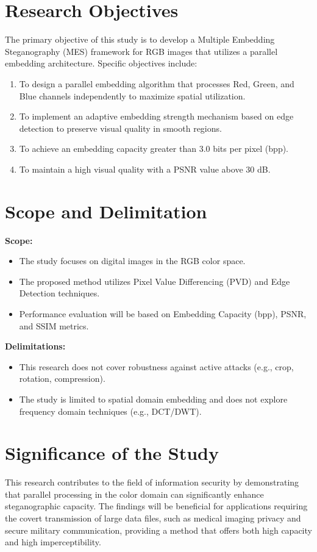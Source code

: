 \section{Research Objectives}
The primary objective of this study is to develop a Multiple Embedding Steganography (MES) framework for RGB images that utilizes a parallel embedding architecture.
Specific objectives include:
\begin{enumerate}
    \item To design a parallel embedding algorithm that processes Red, Green, and Blue channels independently to maximize spatial utilization.
    \item To implement an adaptive embedding strength mechanism based on edge detection to preserve visual quality in smooth regions.
    \item To achieve an embedding capacity greater than 3.0 bits per pixel (bpp).
    \item To maintain a high visual quality with a PSNR value above 30 dB.
\end{enumerate}

\section{Scope and Delimitation}
\textbf{Scope:}
\begin{itemize}
    \item The study focuses on digital images in the RGB color space.
    \item The proposed method utilizes Pixel Value Differencing (PVD) and Edge Detection techniques.
    \item Performance evaluation will be based on Embedding Capacity (bpp), PSNR, and SSIM metrics.
\end{itemize}

\textbf{Delimitations:}
\begin{itemize}
    \item This research does not cover robustness against active attacks (e.g., crop, rotation, compression).
    \item The study is limited to spatial domain embedding and does not explore frequency domain techniques (e.g., DCT/DWT).
\end{itemize}

\section{Significance of the Study}
This research contributes to the field of information security by demonstrating that parallel processing in the color domain can significantly enhance steganographic capacity. The findings will be beneficial for applications requiring the covert transmission of large data files, such as medical imaging privacy and secure military communication, providing a method that offers both high capacity and high imperceptibility.
